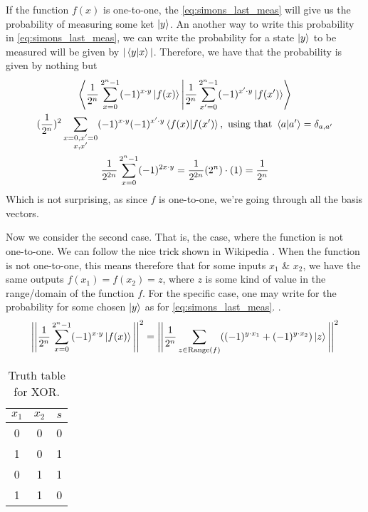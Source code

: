 If the function $f(x)$ is one-to-one, the \autoref{eq:simons_last_meas} will give us the probability of measuring some ket $\ket{y}$.
An another way to write this probability in \autoref{eq:simons_last_meas}, we can write the probability for a state $\ket{y}$ to be measured will be 
given by $|\bra{y}\ket{x}|$. Therefore, we have that the probability is given by nothing but 
\begin{gather}
  \Bigg< \frac{1}{2^n} \sum_{x=0}^{2^n-1} (-1)^{x\cdot y}\ket{f(x)} \Bigg| \frac{1}{2^n} \sum_{x'=0}^{2^n-1}(-1)^{x' \cdot y} \ket{f(x')} \Biggr> \\
  (\frac{1}{2^n})^2 \sum_{\substack{x=0,x'=0\\ x,x'}} (-1)^{x\cdot y} (-1)^{x' \cdot y} \bra{f(x)}\ket{f(x')}, \text{ using that } \bra{a}\ket{a'}=\delta_{a,a'} \\
   \frac{1}{2^{2n}} \sum_{x=0}^{2^n-1}(-1)^{2x\cdot y}= \frac{1}{2^{2n}} (2^n)\cdot(1)=\frac{1}{2^n}
   \label{eq:simons_inner_product}
\end{gather}
Which is not surprising, as since $f$ is one-to-one, we're going through all the basis vectors.

Now we consider the second case. That is, the case, where the function is not one-to-one. We can follow the nice trick shown 
in Wikipedia \cite{noauthor_simons_2023}. When the function is not one-to-one, this means therefore that for some inputs $x_1$ \& $x_2$,
we have the same outputs $f(x_1)=f(x_2)=z$, where $z$ is some kind of value in the range/domain of the function $f$. For the specific case, one may write for 
the probability for some chosen $\ket{y}$ as for \autoref{eq:simons_last_meas}.
\cite{noauthor_simons_2023}.
\begin{gather}
  \Bigg|\Bigg| \frac{1}{2^n}\sum_{x=0}^{2^n-1} (-1)^{x\cdot y} \ket{f(x)} \Bigg|\Bigg|^2 = 
  \Bigg|\Bigg| \frac{1}{2^n} \sum_{z\in \text{Range}(f)}((-1)^{y\cdot x_1} +(-1)^{y\cdot x_2})\ket{z} \Bigg| \Bigg|^2
  \label{eq:simons_z_range}
\end{gather}
\begin{wraptable}{l}{3cm}
  \centering
  \begin{tabular}{|c|c|c|}
    \hline
    $x_1$ & $x_2$ & $s$ \\
    \hline
    \hline
    0 & 0 & 0 \\
    \hline
    1 & 0 & 1 \\
    \hline
    0 & 1 & 1 \\
    \hline
    1 & 1 & 0 \\
    \hline
  \end{tabular}
  \caption{Truth table for XOR.}
  \vspace{-1.0cm}
  \label{table:xor_truth_table}
\end{wraptable}

